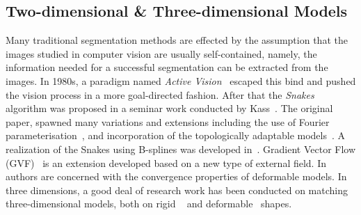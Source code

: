 \documentclass[conference]{IEEEtran}
\begin{document}
\subsection{Two-dimensional \& Three-dimensional Models}
\label{sec:23m}
Many traditional segmentation methods are effected by the assumption that the
images studied in computer vision are usually self-contained, namely,
the information needed for a successful segmentation can be extracted
from the images. In 1980s, a paradigm named \textit{Active Vision}~\cite{aloimonos1988active} 
escaped this bind and pushed the vision process in a more goal-directed fashion. 
After that the \textit{Snakes} algorithm was proposed in a seminar work conducted 
by Kass~\cite{kass1988snakes}. The original paper, spawned many variations
and extensions including the use of Fourier parameterisation~\cite{scott1987alternative}, 
and incorporation of the topologically adaptable models~\cite{mcinerney1995topologically}.
A realization of the Snakes using B-splines was developed in~\cite{brigger2000b}. 
Gradient Vector Flow (GVF)~\cite{xu1998snakes} is an extension developed
based on a new type of external field. In~\cite{xu2000gradient}
authors are concerned with the convergence properties of deformable
models. In three dimensions, a good deal of research work has been
conducted on matching three-dimensional models, both on rigid
~\cite{harris1993tracking} and deformable~\cite{terzopoulos1991dynamic} shapes.
\end{document}
